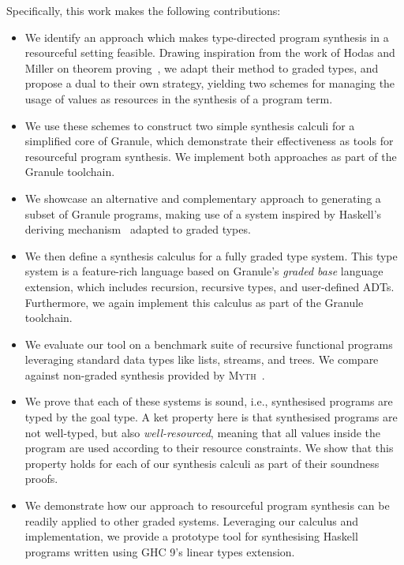 Specifically, this work makes the following contributions:
\begin{itemize}
  \item We identify an approach which makes type-directed program synthesis in
        a resourceful setting feasible. Drawing inspiration from the work of
        Hodas and Miller on theorem proving~\citep{HODAS1994327}, we adapt their
        method to graded types, and propose a dual to their own strategy, yielding two
        schemes for managing the usage of values as resources in the
        synthesis of a program term. 

  \item We use these schemes to construct two simple synthesis calculi for a
        simplified core of Granule, which demonstrate their effectiveness as
        tools for resourceful program synthesis. We implement both approaches as 
        part of the Granule toolchain. 

  \item We showcase an alternative and complementary approach to generating a
        subset of Granule programs, making use of a system inspired by Haskell's
        deriving mechanism~\cite{generic-deriving} adapted to graded types.

  \item We then define a synthesis calculus for a fully graded type system. This
        type system is a feature-rich language based on Granule's \emph{graded
        base} language extension, which includes recursion, recursive types, and
        user-defined ADTs. Furthermore, we again implement this calculus as part
        of the Granule toolchain.

  \item We evaluate our tool on a benchmark suite of recursive functional
        programs leveraging standard data types like lists, streams, and trees.
        We compare against non-graded synthesis provided by
        \textsc{Myth}~\citep{oseraMYTH1}.

  \item We prove that each of these systems is sound, i.e., synthesised programs
        are typed by the goal type. A ket property here is that synthesised programs 
        are not well-typed, but also \emph{well-resourced}, meaning that all values  
        inside the program are used according to their resource constraints. We
        show that this property holds for each of our synthesis calculi as part
        of their soundness proofs. 

  \item We demonstrate how our approach to resourceful program synthesis can be
        readily applied to other graded systems. Leveraging our calculus and
        implementation, we provide a prototype tool for synthesising Haskell
        programs written using GHC 9's linear types extension.
\end{itemize}

